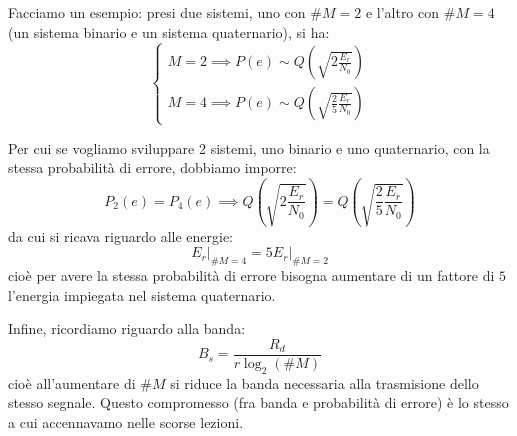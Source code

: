 \documentclass[a4paper,11pt]{article}
\begin{document}
Facciamo un esempio: presi due sistemi, uno con $\# M = 2$ e l'altro con $\# M = 4$ (un sistema binario e un sistema quaternario), si ha:
$$
\begin{cases}
	M = 2 \implies P(e) \sim Q\left( \sqrt{2 \frac{E_r}{N_0}} \right) \\
	M = 4 \implies P(e) \sim Q\left( \sqrt{\frac{2}{5} \frac{E_r}{N_0}} \right)
\end{cases}
$$

Per cui se vogliamo sviluppare 2 sistemi, uno binario e uno quaternario, con la stessa probabilità di errore, dobbiamo imporre:
$$
P_2 (e) = P_4 (e) \implies Q\left( \sqrt{2 \frac{E_r}{N_0}} \right) = Q\left( \sqrt{\frac{2}{5} \frac{E_r}{N_0}} \right)
$$
da cui si ricava riguardo alle energie:
$$
E_r \Big|_{\# M = 4} = 5 E_r \Big|_{\# M = 2}
$$
cioè per avere la stessa probabilità di errore bisogna aumentare di un fattore di $5$ l'energia impiegata nel sistema quaternario.

Infine, ricordiamo riguardo alla banda:
$$
B_s = \frac{R_d}{r \log_2 (\# M)}
$$
cioè all'aumentare di $\# M$ si riduce la banda necessaria alla trasmisione dello stesso segnale. Questo compromesso (fra banda e probabilità di errore) è lo stesso a cui accennavamo nelle scorse lezioni. 
\end{document}
